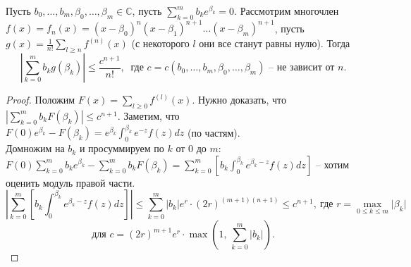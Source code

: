 \begin{lemma} \label{l14_lm7}
	Пусть $b_0,\dots,b_m,\beta_0,\dots,\beta_m \in \mathbb{C}$, пусть $\displaystyle \sum\limits_{k=0}^m b_ke^{\beta_k} = 0$. 
	Рассмотрим многочлен $f(x)=f_n(x) = (x-\beta_0)^n(x-\beta_1)^{n+1}\dots(x-\beta_m)^{n+1}$, пусть $\displaystyle g(x) = \frac{1}{n!}\sum\limits_{l \geq n} f^{(n)}(x)$ (с некоторого $l$ они все станут равны нулю). Тогда
	$$\left| \sum\limits_{k=0}^m b_kg(\beta_k) \right| \leq \frac{c^{n+1}}{n!}, \ \text{ где } c=c(b_0,\dots,b_m,\beta_0,\dots,\beta_m) \text{ -- не зависит от } n.$$
\end{lemma}
\begin{proof}
	Положим $\displaystyle F(x) = \sum\limits_{l \geq 0} f^{(l)}(x)$. Нужно доказать, что $\displaystyle \left| \sum\limits_{k=0}^m b_kF(\beta_k) \right| \leq c^{n+1}$. 
	Заметим, что $\displaystyle F(0)e^{\beta_k} - F(\beta_k) = e^{\beta_k} \int_0^{\beta_k}e^{-z}f(z)dz$ (по частям).\\
	Домножим на $b_k$ и просуммируем по $k$ от $0$ до $m$:\\
	$\displaystyle F(0)\sum_{k=0}^m b_ke^{\beta_k} - \sum\limits_{k=0}^m b_kF(\beta_k) = \sum\limits_{k=0}^m \left[ b_k\int_0^{\beta_k} e^{\beta_k-z}f(z)dz \right]$ -- хотим оценить модуль правой части.
	$$\left| \sum\limits_{k=0}^m \left[ b_k\int_0^{\beta_k} e^{\beta_k-z}f(z)dz \right] \right| \leq \sum\limits_{k=0}^m |b_k|e^r \cdot (2r)^{(m+1)(n+1)} \leq c^{n+1}, \ \text{где } r=\max\limits_{0\leq k \leq m} \lvert \beta_k \rvert$$
	$$\text{для } c=(2r)^{m+1}e^r\cdot\max\left( 1, \, \sum\limits_{k=0}^m \lvert b_k \rvert \right).$$
\end{proof}


